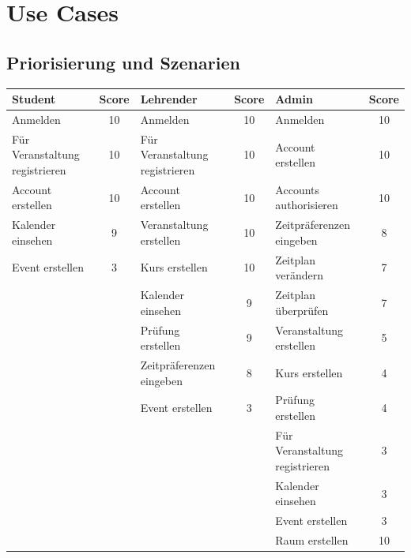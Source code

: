 \documentclass[a4paper,12pt]{article}
\begin{document}
\section*{Use Cases}
	\subsection*{Priorisierung und Szenarien}
	\begin{tabular}{|p{3cm}|c|p{3cm}|c|p{3cm}|c|}
		\hline
		\textbf{Student} & \textbf{Score} & \textbf{Lehrender} & \textbf{Score} & \textbf{Admin} & \textbf{Score} \\ \hline
		Anmelden & 10 & Anmelden & 10 & Anmelden & 10 \\ \hline
		Für Veranstaltung registrieren & 10 & Für Veranstaltung registrieren & 10 & Account erstellen & 10 \\ \hline
		Account erstellen & 10 & Account erstellen & 10 & Accounts authorisieren & 10 \\ \hline
		Kalender einsehen & 9 & Veranstaltung erstellen & 10 & Zeitpräferenzen eingeben & 8 \\ \hline
		Event erstellen & 3 & Kurs erstellen & 10 & Zeitplan verändern & 7 \\ \hline
		&& Kalender einsehen & 9 & Zeitplan überprüfen & 7 \\ \hline
		&& Prüfung erstellen & 9 & Veranstaltung erstellen & 5 \\ \hline
		&& Zeitpräferenzen eingeben & 8 & Kurs erstellen & 4 \\ \hline
		&& Event erstellen & 3 & Prüfung erstellen & 4 \\ \hline
		&&&& Für Veranstaltung registrieren & 3 \\ \hline
		&&&& Kalender einsehen & 3 \\ \hline
		&&&& Event erstellen & 3 \\ \hline
		&&&& Raum erstellen & 10 \\ \hline
	\end{tabular}
	\newpage
\end{document}

